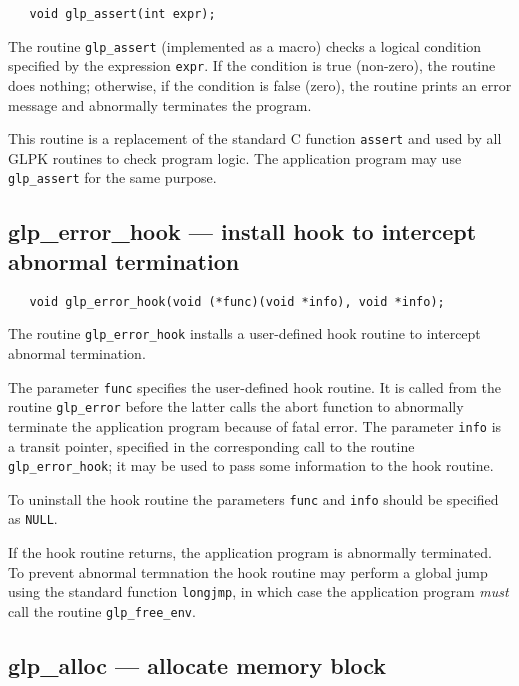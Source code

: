\synopsis

\begin{verbatim}
   void glp_assert(int expr);
\end{verbatim}

\description

The routine \verb|glp_assert| (implemented as a macro) checks
a logical condition specified by the expression \verb|expr|. If the
condition is true (non-zero), the routine does nothing; otherwise, if
the condition is false (zero), the routine prints an error message and
abnormally terminates the program.

This routine is a replacement of the standard C function \verb|assert|
and used by all GLPK routines to check program logic. The application
program may use \verb|glp_assert| for the same purpose.

\subsection{glp\_error\_hook --- install hook to intercept abnormal
termination}

\synopsis

\begin{verbatim}
   void glp_error_hook(void (*func)(void *info), void *info);
\end{verbatim}

\description

The routine \verb|glp_error_hook| installs a user-defined hook routine
to intercept abnormal termination.

The parameter \verb|func| specifies the user-defined hook routine. It
is called from the routine \verb|glp_error| before the latter calls the
abort function to abnormally terminate the application program because
of fatal error. The parameter \verb|info| is a transit pointer,
specified in the corresponding call to the routine
\verb|glp_error_hook|; it may be used to pass some information to the
hook routine.

To uninstall the hook routine the parameters \verb|func| and \verb|info|
should be specified as \verb|NULL|.

If the hook routine returns, the application program is abnormally
terminated. To prevent abnormal termnation the hook routine may perform
a global jump using the standard function \verb|longjmp|, in which case
the application program {\it must} call the routine \verb|glp_free_env|.

\subsection{glp\_alloc --- allocate memory block}

